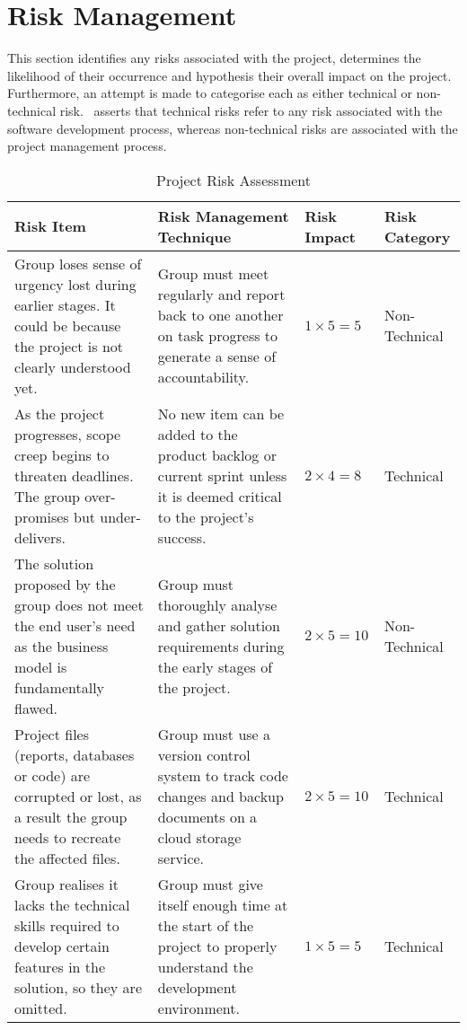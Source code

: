 \section{Risk Management}

This section identifies any risks associated with the project, determines the likelihood of their occurrence and hypothesis their overall impact on the project. Furthermore, an attempt is made to categorise each as either technical or non-technical risk.~\parencite{dawson} asserts that technical risks refer to any risk associated with the software development process, whereas non-technical risks are associated with the project management process.

\begin{table}
  \caption[Project Risk Assessment]{Project Risk Assessment \hfill}
  \label{tab:runtime}
  \begin{tabular*}{14.0cm}{p{4.0cm}p{5.0cm}p{1.5cm}p{2cm}}
    \toprule
    Risk Item & Risk Management Technique & Risk Impact & Risk Category \\
    \midrule
    Group loses sense of urgency lost during earlier stages. It could be because the project is not clearly understood yet. & Group must meet regularly and report back to one another on task progress to generate a sense of accountability. & $1 \times 5 = 5$ & Non-Technical \\
    \addlinespace[0.5em]
    As the project progresses, scope creep begins to threaten deadlines. The group over-promises but under-delivers. & No new item can be added to the product backlog or current sprint unless it is deemed critical to the project’s success. & $2 \times 4 = 8$ & Technical \\
    \addlinespace[0.5em]
    The solution proposed by the group does not meet the end user’s need as the business model is fundamentally flawed. & Group must thoroughly analyse and gather solution requirements during the early stages of the project. & $2 \times 5 = 10$ & Non-Technical \\
    \addlinespace[0.5em]
    Project files (reports, databases or code) are corrupted or lost, as a result the group needs to recreate the affected files. & Group must use a version control system to track code changes and backup documents on a cloud storage service. & $2 \times 5 = 10$ & Technical \\
    \addlinespace[0.5em]
    Group realises it lacks the technical skills required to develop certain features in the solution, so they are omitted. & Group must give itself enough time at the start of the project to properly understand the development environment. & $1 \times 5 = 5$ & Technical \\

\end{tabular*}
\end{table}
